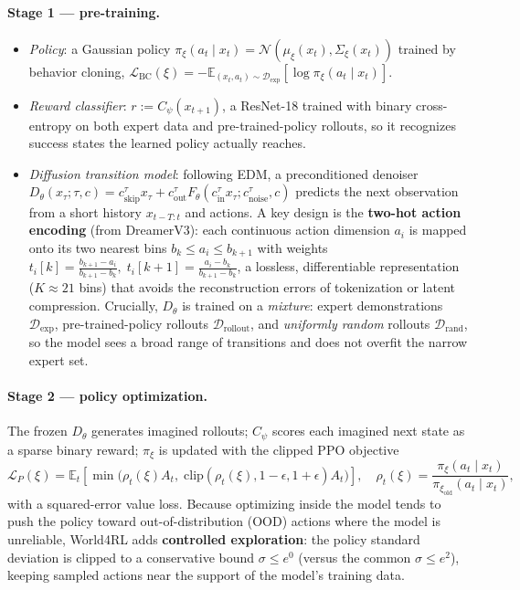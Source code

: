 \documentclass[11pt]{article}
\begin{document}
\paragraph{Stage 1 --- pre-training.}
\begin{itemize}[leftmargin=1.4em,itemsep=2pt]
  \item \emph{Policy}: a Gaussian policy $\pi_\xi(a_t\mid x_t)=\mathcal{N}(\mu_\xi(x_t),\Sigma_\xi(x_t))$
  trained by behavior cloning, $\mathcal{L}_{\mathrm{BC}}(\xi)=-\mathbb{E}_{(x_t,a_t)\sim\mathcal{D}_{\exp}}[\log\pi_\xi(a_t\mid x_t)]$.
  \item \emph{Reward classifier}: $r:=C_\psi(x_{t+1})$, a ResNet-18 trained with binary cross-entropy on
  both expert data and pre-trained-policy rollouts, so it recognizes success states the learned policy
  actually reaches.
  \item \emph{Diffusion transition model}: following EDM, a preconditioned denoiser
  $D_\theta(x_\tau;\tau,c)=c^\tau_{\mathrm{skip}}x_\tau+c^\tau_{\mathrm{out}}F_\theta(c^\tau_{\mathrm{in}}x_\tau;c^\tau_{\mathrm{noise}},c)$
  predicts the next observation from a short history $x_{t-T:t}$ and actions. A key design is the
  \textbf{two-hot action encoding} (from DreamerV3): each continuous action dimension $a_i$ is mapped
  onto its two nearest bins $b_k\le a_i\le b_{k+1}$ with weights
  $t_i[k]=\tfrac{b_{k+1}-a_i}{b_{k+1}-b_k},\; t_i[k{+}1]=\tfrac{a_i-b_k}{b_{k+1}-b_k}$,
  a lossless, differentiable representation ($K\!\approx\!21$ bins) that avoids the reconstruction errors
  of tokenization or latent compression. Crucially, $D_\theta$ is trained on a \emph{mixture}:
  expert demonstrations $\mathcal{D}_{\exp}$, pre-trained-policy rollouts $\mathcal{D}_{\mathrm{rollout}}$,
  and \emph{uniformly random} rollouts $\mathcal{D}_{\mathrm{rand}}$, so the model sees a broad range of
  transitions and does not overfit the narrow expert set.
\end{itemize}

\paragraph{Stage 2 --- policy optimization.}
The frozen $D_\theta$ generates imagined rollouts; $C_\psi$ scores each imagined next state as a sparse
binary reward; $\pi_\xi$ is updated with the clipped PPO objective
\begin{equation}
\mathcal{L}_P(\xi)=\mathbb{E}_t\!\left[\min\!\big(\rho_t(\xi)A_t,\;\mathrm{clip}(\rho_t(\xi),1-\epsilon,1+\epsilon)A_t\big)\right],
\quad \rho_t(\xi)=\frac{\pi_\xi(a_t\mid x_t)}{\pi_{\xi_{\mathrm{old}}}(a_t\mid x_t)},
\end{equation}
with a squared-error value loss. Because optimizing inside the model tends to push the policy toward
out-of-distribution (OOD) actions where the model is unreliable, World4RL adds \textbf{controlled
exploration}: the policy standard deviation is clipped to a conservative bound $\sigma\le e^{0}$ (versus
the common $\sigma\le e^{2}$), keeping sampled actions near the support of the model's training data.
\end{document}
